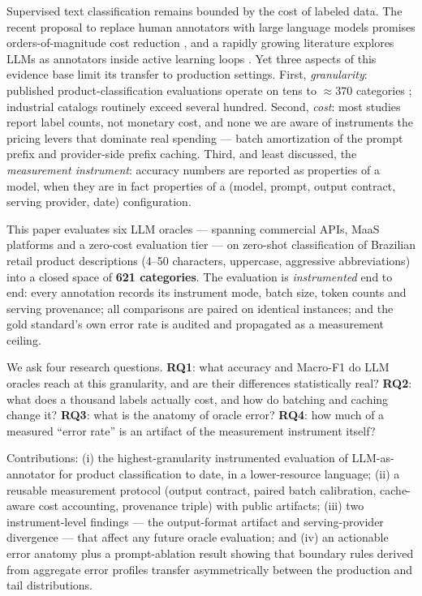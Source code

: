 \documentclass[11pt]{article}
\begin{document}
Supervised text classification remains bounded by the cost of labeled data.
The recent proposal to replace human annotators with large language models
promises orders-of-magnitude cost reduction \citep{Gilardi2023}, and a
rapidly growing literature explores LLMs as annotators inside active
learning loops \citep{Zhang2025,Rouzegar2024,Kholodna2024,Bayer2024}. Yet
three aspects of this evidence base limit its transfer to production
settings. First, \emph{granularity}: published product-classification
evaluations operate on tens to $\approx 370$ categories
\citep{Roumeliotis2025,Gholamian2024}; industrial catalogs routinely exceed
several hundred. Second, \emph{cost}: most studies report label counts, not
monetary cost, and none we are aware of instruments the pricing levers that
dominate real spending --- batch amortization of the prompt prefix and
provider-side prefix caching. Third, and least discussed, the
\emph{measurement instrument}: accuracy numbers are reported as properties
of a model, when they are in fact properties of a (model, prompt, output
contract, serving provider, date) configuration.

This paper evaluates six LLM oracles --- spanning commercial APIs, MaaS
platforms and a zero-cost evaluation tier --- on zero-shot classification of
Brazilian retail product descriptions (4--50 characters, uppercase,
aggressive abbreviations) into a closed space of \textbf{621 categories}.
The evaluation is \emph{instrumented} end to end: every annotation records
its instrument mode, batch size, token counts and serving provenance; all
comparisons are paired on identical instances; and the gold standard's own
error rate is audited and propagated as a measurement ceiling.

We ask four research questions. \textbf{RQ1}: what accuracy and Macro-F1 do
LLM oracles reach at this granularity, and are their differences
statistically real? \textbf{RQ2}: what does a thousand labels actually cost,
and how do batching and caching change it? \textbf{RQ3}: what is the
anatomy of oracle error? \textbf{RQ4}: how much of a measured ``error rate''
is an artifact of the measurement instrument itself?

Contributions: (i) the highest-granularity instrumented evaluation of
LLM-as-annotator for product classification to date, in a lower-resource
language; (ii) a reusable measurement protocol (output contract, paired
batch calibration, cache-aware cost accounting, provenance triple) with
public artifacts; (iii) two instrument-level findings --- the output-format
artifact and serving-provider divergence --- that affect any future oracle
evaluation; and (iv) an actionable error anatomy plus a prompt-ablation
result showing that boundary rules derived from aggregate error profiles
transfer asymmetrically between the production and tail distributions.
\end{document}

